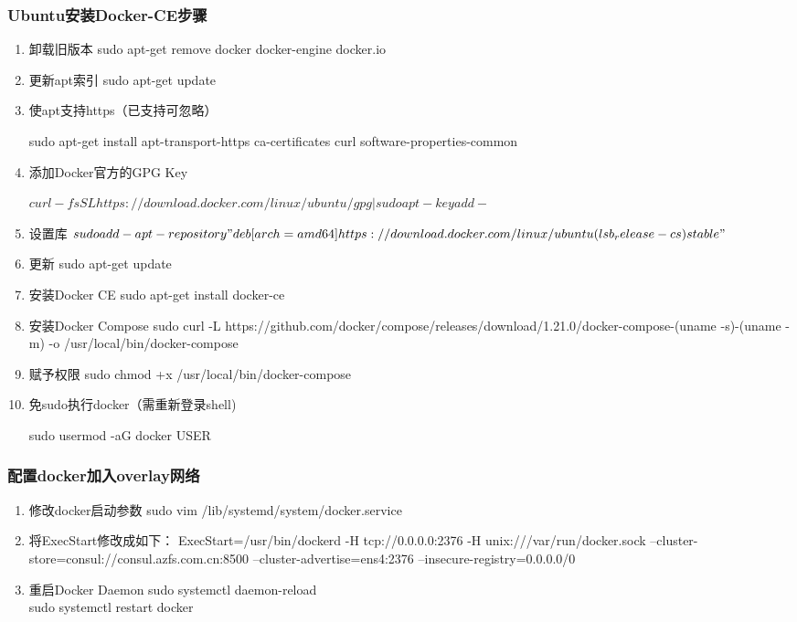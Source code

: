 \documentclass[a4paper]{article}
\begin{document}
\subsubsection*{Ubuntu安装Docker-CE步骤} 
\begin{enumerate}
\item 卸载旧版本 
sudo apt-get remove docker docker-engine docker.io

\item 更新apt索引 
sudo apt-get update

\item 使apt支持https（已支持可忽略）

sudo apt-get install apt-transport-https ca-certificates curl software-properties-common

\item 添加Docker官方的GPG Key 

$curl -fsSL https://download.docker.com/linux/ubuntu/gpg | sudo apt-key add -$
\item 设置库
$sudo add-apt-repository "deb [arch=amd64] https://download.docker.com/linux/ubuntu (lsb_release -cs) stable"$

\item 更新 
sudo apt-get update

\item 安装Docker CE 
sudo apt-get install docker-ce

\item 安装Docker Compose 
sudo curl -L https://github.com/docker/compose/releases/download/1.21.0/docker-compose-(uname -s)-(uname -m) -o /usr/local/bin/docker-compose

\item 赋予权限 
sudo chmod +x /usr/local/bin/docker-compose

\item 免sudo执行docker（需重新登录shell) 

sudo usermod -aG docker {USER}
\end{enumerate}

\subsubsection*{配置docker加入overlay网络}
\begin{enumerate}
\item 修改docker启动参数 
sudo vim /lib/systemd/system/docker.service

\item 将ExecStart修改成如下：
ExecStart=/usr/bin/dockerd -H tcp://0.0.0.0:2376 -H unix:///var/run/docker.sock --cluster-store=consul://consul.azfs.com.cn:8500 --cluster-advertise=ens4:2376 --insecure-registry=0.0.0.0/0

\item 重启Docker Daemon 
sudo systemctl daemon-reload \\
sudo systemctl restart docker
\end{enumerate}
\end{document}
